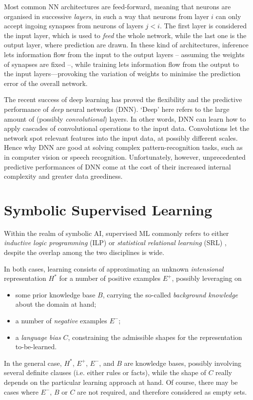 \documentclass[12pt,a4paper,openright,twoside]{book}
\begin{document}
Most common NN architectures are feed-forward, meaning that neurons are organised in successive \emph{layers}, in such a way that neurons from layer $i$ can only accept ingoing synapses from neurons of layers $j < i$.
%
The first layer is considered the input layer, which is used to \emph{feed} the whole network, while the last one is the output layer, where prediction are drawn.
%
In these kind of architectures, inference lets information flow from the input to the output layers -- assuming the weights of synapses are fixed --, while training lets information flow from the output to the input layers---provoking the variation of weights to minimise the prediction error of the overall network.

The recent success of deep learning \cite{GoodfellowBC2016} has proved the flexibility and the predictive performance of \emph{deep} neural networks (DNN).
%
`Deep' here refers to the large amount of (possibly \emph{convolutional}) layers.
%
In other words, DNN can learn how to apply cascades of convolutional operations to the input data.
%
Convolutions let the network spot relevant features into the input data, at possibly different scales.
%
Hence why DNN are good at solving complex pattern-recognition tasks, such as in computer vision or speech recognition.
%
Unfortunately, however, unprecedented predictive performances of DNN come at the cost of their increased internal complexity and greater data greediness.

\section{Symbolic Supervised Learning}
\label{sec:symbolic-supervised-learning}

Within the realm of symbolic AI, supervised ML commonly refers to either \emph{inductive logic programming} (ILP) \cite{Muggleton91} or \emph{statistical relational learning} (SRL) \cite{DeRaedt2010}, despite the overlap among the two disciplines is wide.

In both cases, learning consists of approximating an unknown \emph{intensional} representation $H^*$ for a number of positive examples $E^+$, possibly leveraging on
%
\begin{itemize}
    \item some prior knowledge base $B$, carrying the so-called \emph{background knowledge} about the domain at hand;
    \item a number of \emph{negative} examples $E^-$;
    \item a \emph{language bias} $C$, constraining the admissible shapes for the representation to-be-learned.
\end{itemize}
%
In the general case, $H^*$, $E^+$, $E^-$, and $B$ are knowledge bases, possibly involving several definite clauses (i.e. either rules or facts), while the shape of $C$ really depends on the particular learning approach at hand.
%
Of course, there may be cases where $E^-$, $B$ or $C$ are not required, and therefore considered as empty sets.
\end{document}
